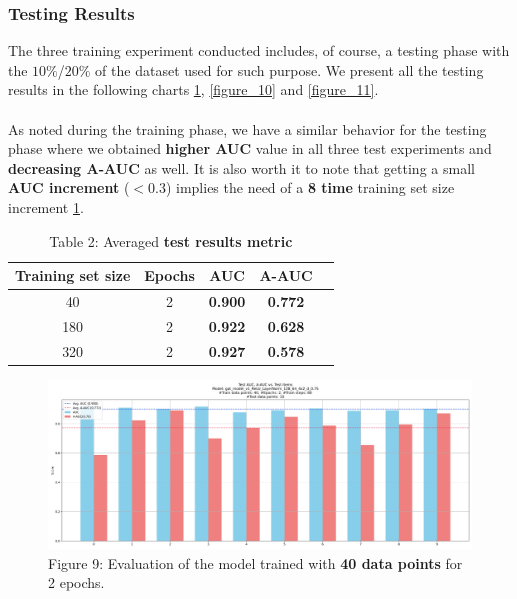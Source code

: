 \documentclass[11pt]{article}
\begin{document}
	\clearpage
	\subsubsection{Testing Results}
	The three training experiment conducted includes, of course, a testing phase with the $10\%$/$20\%$ of the dataset used for such purpose.
	We present all the testing results in the following charts \ref{figure_9}, \ref{figure_10} and \ref{figure_11}. \\\\
	As noted during the training phase, we have a similar behavior for the testing phase where we obtained \textbf{higher AUC} value in all three test experiments and \textbf{decreasing A-AUC} as well. It is also worth it to note that getting a small \textbf{AUC increment} ($<0.3$) implies the need of a \textbf{8 time} training set size increment \ref{table_2}. 
	
	\begin{table}[h!]
		\centering
		\begin{tabular}{ccccc}
			\toprule
			Training set size & Epochs & \textbf{AUC} & \textbf{A-AUC} \\
			\midrule
			40  & 2 & \textbf{0.900} & \textbf{0.772} \\
			180 & 2 & \textbf{0.922} & \textbf{0.628} \\
			320 & 2 & \textbf{0.927} & \textbf{0.578} \\
			\bottomrule
		\end{tabular}
		\caption{Table 2: Averaged \textbf{test results metric}}
		\label{table_2}
	\end{table}
	
	\begin{figure}[h!] %
		\centering
		\includegraphics[width=1\textwidth]{images/test_auc_10_gat_model_v1_ReLU_LayerNorm_128_64_4x2_d_0.75_40_2_20250202-144028.jpg}
		\caption{Figure 9: Evaluation of the model trained with \textbf{40 data points} for 2 epochs.}
		\label{figure_9}
	\end{figure}
	
\end{document}
